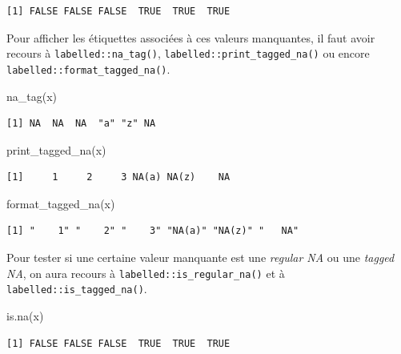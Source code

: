 \documentclass[
  letterpaper,
  DIV=11,
  numbers=noendperiod,
  oneside]{scrreprt}
\newenvironment{Shaded}{\begin{snugshade}}{\end{snugshade}}
\newcommand{\FunctionTok}[1]{\textcolor[rgb]{0.28,0.35,0.67}{#1}}
\newcommand{\NormalTok}[1]{\textcolor[rgb]{0.00,0.23,0.31}{#1}}
\begin{document}
\begin{verbatim}
[1] FALSE FALSE FALSE  TRUE  TRUE  TRUE
\end{verbatim}

Pour afficher les étiquettes associées à ces valeurs manquantes, il faut
avoir recours à \texttt{labelled::na\_tag()},
\texttt{labelled::print\_tagged\_na()} ou encore
\texttt{labelled::format\_tagged\_na()}.

\begin{Shaded}
\begin{Highlighting}[]
\FunctionTok{na\_tag}\NormalTok{(x)}
\end{Highlighting}
\end{Shaded}

\begin{verbatim}
[1] NA  NA  NA  "a" "z" NA 
\end{verbatim}

\begin{Shaded}
\begin{Highlighting}[]
\FunctionTok{print\_tagged\_na}\NormalTok{(x)}
\end{Highlighting}
\end{Shaded}

\begin{verbatim}
[1]     1     2     3 NA(a) NA(z)    NA
\end{verbatim}

\begin{Shaded}
\begin{Highlighting}[]
\FunctionTok{format\_tagged\_na}\NormalTok{(x)}
\end{Highlighting}
\end{Shaded}

\begin{verbatim}
[1] "    1" "    2" "    3" "NA(a)" "NA(z)" "   NA"
\end{verbatim}

Pour tester si une certaine valeur manquante est une \emph{regular NA}
ou une \emph{tagged NA}, on aura recours à
\texttt{labelled::is\_regular\_na()} et à
\texttt{labelled::is\_tagged\_na()}.

\begin{Shaded}
\begin{Highlighting}[]
\FunctionTok{is.na}\NormalTok{(x)}
\end{Highlighting}
\end{Shaded}

\begin{verbatim}
[1] FALSE FALSE FALSE  TRUE  TRUE  TRUE
\end{verbatim}
\end{document}
